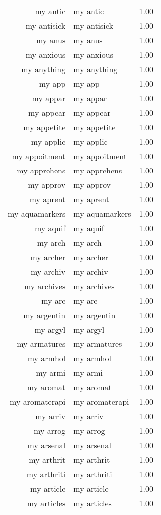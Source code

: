 \begin{table}[ht]
\begin{tabular}{rlr}
  my antic & my antic & 1.00 \\ 
  my antisick & my antisick & 1.00 \\ 
  my anus & my anus & 1.00 \\ 
  my anxious & my anxious & 1.00 \\ 
  my anything & my anything & 1.00 \\ 
  my app & my app & 1.00 \\ 
  my appar & my appar & 1.00 \\ 
  my appear & my appear & 1.00 \\ 
  my appetite & my appetite & 1.00 \\ 
  my applic & my applic & 1.00 \\ 
  my appoitment & my appoitment & 1.00 \\ 
  my apprehens & my apprehens & 1.00 \\ 
  my approv & my approv & 1.00 \\ 
  my aprent & my aprent & 1.00 \\ 
  my aquamarkers & my aquamarkers & 1.00 \\ 
  my aquif & my aquif & 1.00 \\ 
  my arch & my arch & 1.00 \\ 
  my archer & my archer & 1.00 \\ 
  my archiv & my archiv & 1.00 \\ 
  my archives & my archives & 1.00 \\ 
  my are & my are & 1.00 \\ 
  my argentin & my argentin & 1.00 \\ 
  my argyl & my argyl & 1.00 \\ 
  my armatures & my armatures & 1.00 \\ 
  my armhol & my armhol & 1.00 \\ 
  my armi & my armi & 1.00 \\ 
  my aromat & my aromat & 1.00 \\ 
  my aromaterapi & my aromaterapi & 1.00 \\ 
  my arriv & my arriv & 1.00 \\ 
  my arrog & my arrog & 1.00 \\ 
  my arsenal & my arsenal & 1.00 \\ 
  my arthrit & my arthrit & 1.00 \\ 
  my arthriti & my arthriti & 1.00 \\ 
  my article & my article & 1.00 \\ 
  my articles & my articles & 1.00 \\ 

\end{tabular}
\end{table}
